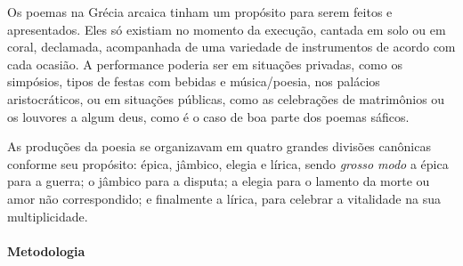 \documentclass[12pt]{extarticle}
\begin{document}
Os poemas na Grécia arcaica tinham um propósito para serem feitos e apresentados. 
Eles só existiam no momento da execução, cantada em solo ou em coral, 
declamada, acompanhada de uma variedade de instrumentos de acordo com cada ocasião. 
A performance poderia ser em situações privadas, como os simpósios, tipos 
de festas com bebidas e música/poesia, nos palácios aristocráticos, ou em situações 
públicas, como as celebrações de matrimônios ou os louvores a algum deus, como é o
caso de boa parte dos poemas sáficos. 

As produções da poesia se organizavam em quatro grandes divisões canônicas conforme
seu propósito: épica, jâmbico, elegia e lírica, sendo \emph{grosso modo} a épica 
para a guerra; o jâmbico para a disputa; a elegia para o lamento da morte ou amor 
não correspondido; e finalmente a lírica, para celebrar a vitalidade na sua multiplicidade.


\paragraph{Metodologia} 
\end{document}
